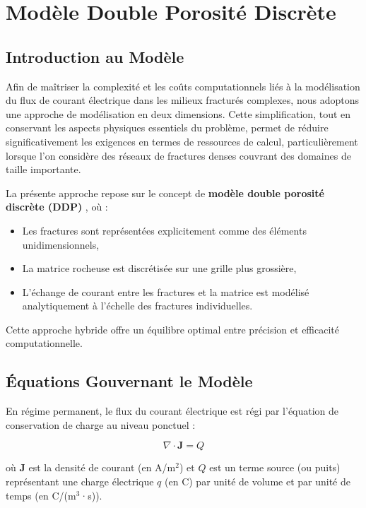 \chapter{Modèle Double Porosité Discrète}

\section{Introduction au Modèle}
\label{sec:intro}

Afin de maîtriser la complexité et les coûts computationnels liés à la modélisation du flux de courant électrique dans les milieux fracturés complexes, nous adoptons une approche de modélisation en deux dimensions. Cette simplification, tout en conservant les aspects physiques essentiels du problème, permet de réduire significativement les exigences en termes de ressources de calcul, particulièrement lorsque l'on considère des réseaux de fractures denses couvrant des domaines de taille importante.

La présente approche repose sur le concept de \textbf{modèle double porosité discrète (DDP)} \parencite{Roubinet2014}, où :
\begin{itemize}
    \item Les fractures sont représentées explicitement comme des éléments unidimensionnels,
    \item La matrice rocheuse est discrétisée sur une grille plus grossière,
    \item L'échange de courant entre les fractures et la matrice est modélisé analytiquement à l'échelle des fractures individuelles.
\end{itemize}

Cette approche hybride offre un équilibre optimal entre précision et efficacité computationnelle.

\section{Équations Gouvernant le Modèle}
\label{sec:equations}

En régime permanent, le flux du courant électrique est régi par l'équation de conservation de charge au niveau ponctuel :

\begin{equation}
\nabla \cdot \mathbf{J} = Q
\label{eq:charge_conservation}
\end{equation}

où $\mathbf{J}$ est la densité de courant (en A/m$^2$) et $Q$ est un terme source (ou puits) représentant une charge électrique $q$ (en C) par unité de volume et par unité de temps (en C/(m$^3$·s)).


